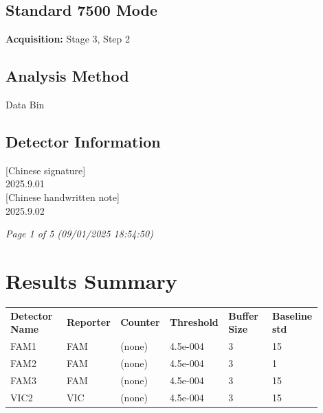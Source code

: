 \documentclass[UTF8,10pt,a4paper,fontset=fandol]{ctexart}
\newcommand{\handwritten}[1]{#1}
\begin{document}
\subsection*{Standard 7500 Mode}

\textbf{Acquisition:} Stage 3, Step 2

\subsection*{Analysis Method}

Data Bin

\subsection*{Detector Information}


\begin{flushright}
\handwritten{[Chinese signature]}\\[0.4em]
\handwritten{2025.9.01}\\[0.8em]
\handwritten{[Chinese handwritten note]}\\[0.4em]
\handwritten{2025.9.02}
\end{flushright}

\textit{Page 1 of 5 (09/01/2025 18:54:50)}

\newpage

\section*{Results Summary}

\begin{center}
\small
\begin{tabular}{p{0.18\linewidth}p{0.14\linewidth}p{0.14\linewidth}p{0.16\linewidth}p{0.14\linewidth}p{0.14\linewidth}}
\textbf{Detector Name} & \textbf{Reporter} & \textbf{Counter} &
\textbf{Threshold} & \textbf{Buffer Size} & \textbf{Baseline std} \\
FAM1 & FAM & (none) & 4.5e-004 & 3 & 15 \\
FAM2 & FAM & (none) & 4.5e-004 & 3 & 1 \\
FAM3 & FAM & (none) & 4.5e-004 & 3 & 15 \\
VIC2 & VIC & (none) & 4.5e-004 & 3 & 15 \\
\end{tabular}
\end{center}
\end{document}
